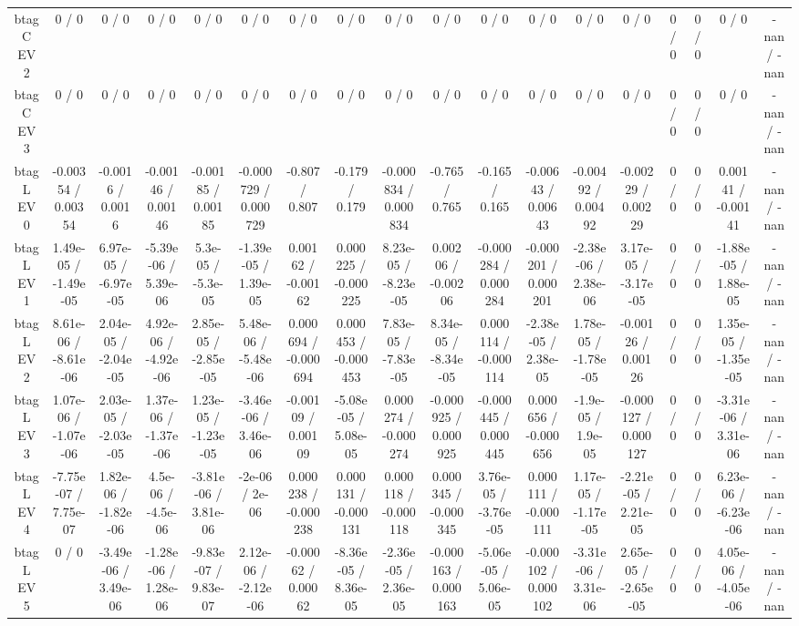 \documentclass[10pt]{article}
\begin{document}
\begin{table}[htbp]
\begin{center}
\begin{tabular}{|c|c|c|c|c|c|c|c|c|c|c|c|c|c|c|c|c|c|}
  btag C EV 2 & 0 / 0 & 0 / 0 & 0 / 0 & 0 / 0 & 0 / 0 & 0 / 0 & 0 / 0 & 0 / 0 & 0 / 0 & 0 / 0 & 0 / 0 & 0 / 0 & 0 / 0 & 0 / 0 & 0 / 0 & 0 / 0 & -nan / -nan \\ 
  btag C EV 3 & 0 / 0 & 0 / 0 & 0 / 0 & 0 / 0 & 0 / 0 & 0 / 0 & 0 / 0 & 0 / 0 & 0 / 0 & 0 / 0 & 0 / 0 & 0 / 0 & 0 / 0 & 0 / 0 & 0 / 0 & 0 / 0 & -nan / -nan \\ 
  btag L EV 0 & -0.00354 / 0.00354 & -0.0016 / 0.0016 & -0.00146 / 0.00146 & -0.00185 / 0.00185 & -0.000729 / 0.000729 & -0.807 / 0.807 & -0.179 / 0.179 & -0.000834 / 0.000834 & -0.765 / 0.765 & -0.165 / 0.165 & -0.00643 / 0.00643 & -0.00492 / 0.00492 & -0.00229 / 0.00229 & 0 / 0 & 0 / 0 & 0.00141 / -0.00141 & -nan / -nan \\ 
  btag L EV 1 & 1.49e-05 / -1.49e-05 & 6.97e-05 / -6.97e-05 & -5.39e-06 / 5.39e-06 & 5.3e-05 / -5.3e-05 & -1.39e-05 / 1.39e-05 & 0.00162 / -0.00162 & 0.000225 / -0.000225 & 8.23e-05 / -8.23e-05 & 0.00206 / -0.00206 & -0.000284 / 0.000284 & -0.000201 / 0.000201 & -2.38e-06 / 2.38e-06 & 3.17e-05 / -3.17e-05 & 0 / 0 & 0 / 0 & -1.88e-05 / 1.88e-05 & -nan / -nan \\ 
  btag L EV 2 & 8.61e-06 / -8.61e-06 & 2.04e-05 / -2.04e-05 & 4.92e-06 / -4.92e-06 & 2.85e-05 / -2.85e-05 & 5.48e-06 / -5.48e-06 & 0.000694 / -0.000694 & 0.000453 / -0.000453 & 7.83e-05 / -7.83e-05 & 8.34e-05 / -8.34e-05 & 0.000114 / -0.000114 & -2.38e-05 / 2.38e-05 & 1.78e-05 / -1.78e-05 & -0.00126 / 0.00126 & 0 / 0 & 0 / 0 & 1.35e-05 / -1.35e-05 & -nan / -nan \\ 
  btag L EV 3 & 1.07e-06 / -1.07e-06 & 2.03e-05 / -2.03e-05 & 1.37e-06 / -1.37e-06 & 1.23e-05 / -1.23e-05 & -3.46e-06 / 3.46e-06 & -0.00109 / 0.00109 & -5.08e-05 / 5.08e-05 & 0.000274 / -0.000274 & -0.000925 / 0.000925 & -0.000445 / 0.000445 & 0.000656 / -0.000656 & -1.9e-05 / 1.9e-05 & -0.000127 / 0.000127 & 0 / 0 & 0 / 0 & -3.31e-06 / 3.31e-06 & -nan / -nan \\ 
  btag L EV 4 & -7.75e-07 / 7.75e-07 & 1.82e-06 / -1.82e-06 & 4.5e-06 / -4.5e-06 & -3.81e-06 / 3.81e-06 & -2e-06 / 2e-06 & 0.000238 / -0.000238 & 0.000131 / -0.000131 & 0.000118 / -0.000118 & 0.000345 / -0.000345 & 3.76e-05 / -3.76e-05 & 0.000111 / -0.000111 & 1.17e-05 / -1.17e-05 & -2.21e-05 / 2.21e-05 & 0 / 0 & 0 / 0 & 6.23e-06 / -6.23e-06 & -nan / -nan \\ 
  btag L EV 5 & 0 / 0 & -3.49e-06 / 3.49e-06 & -1.28e-06 / 1.28e-06 & -9.83e-07 / 9.83e-07 & 2.12e-06 / -2.12e-06 & -0.00062 / 0.00062 & -8.36e-05 / 8.36e-05 & -2.36e-05 / 2.36e-05 & -0.000163 / 0.000163 & -5.06e-05 / 5.06e-05 & -0.000102 / 0.000102 & -3.31e-06 / 3.31e-06 & 2.65e-05 / -2.65e-05 & 0 / 0 & 0 / 0 & 4.05e-06 / -4.05e-06 & -nan / -nan \\ 

\end{tabular}
\end{center}
\end{table}
\end{document}
